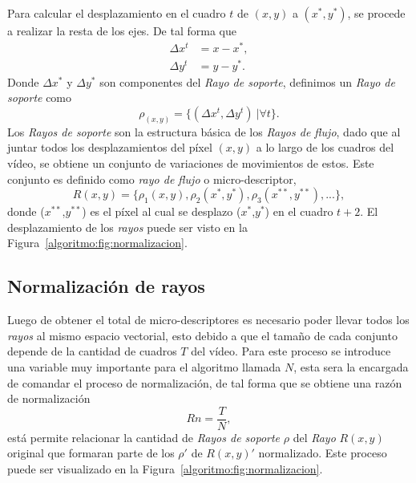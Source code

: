 	Para calcular el desplazamiento en el cuadro $t$ de $(x,y)$ a $(x^*,y^*)$, se procede a realizar la resta de los ejes. De tal forma que
	\begin{align}
		\Delta x^{t} &= x-x^*,\\ 
		\Delta y^{t} &= y-y^*.
	\end{align}
		Donde $ \Delta x^*$ y $ \Delta y^*$ son componentes del \textit{Rayo de soporte}, definimos un \textit{Rayo de soporte} como
	\begin{equation}
		\rho_{(x,y)} = \{(\Delta x^{t}, \Delta y^{t})~| \forall t\}.
	\end{equation}		
	Los \textit{Rayos de soporte} son la estructura básica de los \textit{Rayos de flujo}, dado que al juntar todos los desplazamientos del píxel $(x,y)$ a lo largo de los cuadros del vídeo, se obtiene un conjunto de variaciones de movimientos de estos. Este conjunto es definido como \textit{rayo de flujo} o micro-descriptor,
	\begin{equation}
		R(x,y)	 = \{\rho_1(x,y), \rho_2(x^*,y^*), \rho_3(x^{**},y^{**}), ... \},
	\end{equation}
	donde ($x^{**}$,$y^{**}$) es el píxel al cual se desplazo ($x^{*}$,$y^{*}$) en el cuadro $t+2$. El desplazamiento de los \textit{rayos} puede ser visto en la Figura~\ref{algoritmo:fig:normalizacion}.
		
		
	\subsection{Normalización de rayos}
	\label{algoritmo:normalizacion}
	Luego de obtener el total de micro-descriptores es necesario poder llevar todos los \textit{rayos} al mismo espacio vectorial, esto debido a que el tamaño de cada conjunto depende de la cantidad de cuadros $T$ del vídeo. Para este proceso se introduce una variable muy importante para el algoritmo llamada $N$, esta sera la encargada de comandar el proceso de normalización, de tal forma que se obtiene una razón de normalización
	\begin{equation}
		Rn = \frac{T}{N},
	\end{equation}
	está permite relacionar la cantidad de \textit{Rayos de soporte} $\rho$ del \textit{Rayo} $R(x,y)$ original que formaran parte de los $\rho'$ de $R(x,y)'$ normalizado. Este proceso puede ser visualizado en la Figura~\ref{algoritmo:fig:normalizacion}.
	
